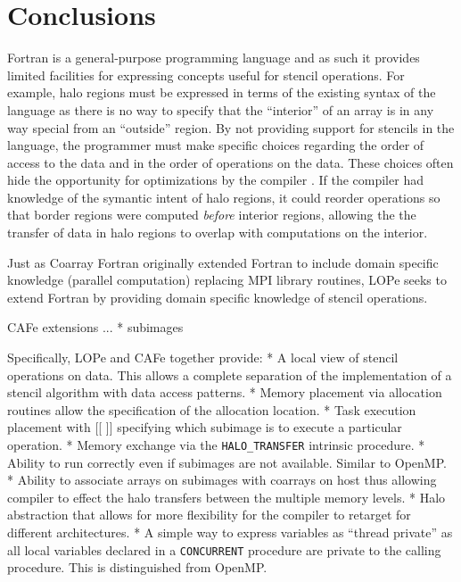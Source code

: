 \section{Conclusions}

Fortran is a general-purpose programming language and as such it provides limited facilities for
expressing concepts useful for stencil operations. For example, halo regions must be expressed in
terms of the existing syntax of the language as there is no way to specify that the ``interior'' of
an array is in any way special from an ``outside'' region.  By not providing support for stencils in
the language, the programmer must make specific choices regarding the order of access to the data
and in the order of operations on the data.  These choices often hide the opportunity for
optimizations by the compiler \cite{dubey:2014:wosc}.  If the compiler had knowledge of the symantic
intent of halo regions, it could reorder operations so that border regions were computed
\emph{before} interior regions, allowing the the transfer of data in halo regions to overlap with
computations on the interior.

%
%



Just as Coarray Fortran originally extended Fortran to include domain specific knowledge (parallel
computation) replacing MPI library routines\cite{numeric:reid}, LOPe seeks to extend Fortran by
providing domain specific knowledge of stencil operations.  

CAFe extensions ...
* subimages

Specifically, LOPe and CAFe together provide:
* A local view of stencil operations on data.  This allows a complete separation of the implementation of a stencil algorithm with data access patterns.
* Memory placement via allocation routines allow the specification of the allocation location.
* Task execution placement with [[ ]] specifying which subimage is to execute a particular operation.
* Memory exchange via the \texttt{HALO\_TRANSFER} intrinsic procedure.
* Ability to run correctly even if subimages are not available.  Similar to OpenMP.
* Ability to associate arrays on subimages with coarrays on host thus allowing compiler to effect the halo transfers between the multiple memory levels.
* Halo abstraction that allows for more flexibility for the compiler to retarget for different architectures.
* A simple way to express variables as ``thread private'' as all local variables declared in a \texttt{CONCURRENT} procedure are private to the calling procedure.  This is distinguished from OpenMP.

